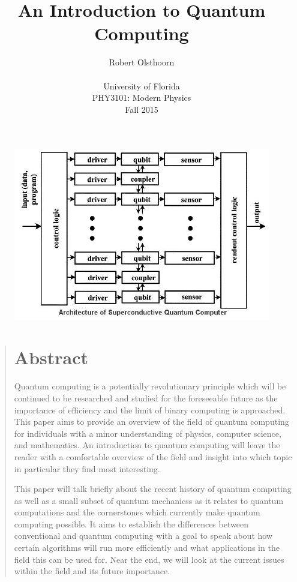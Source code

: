 \documentclass[12pt]{article}
\title{An Introduction to Quantum Computing}
\author
{Robert Olsthoorn\\
\\
\normalsize{University of Florida}\\
\normalsize{PHY3101: Modern Physics}\\
\normalsize{Fall 2015}\\
}
\date{}
\newenvironment{sciabstract}{%
\begin{quote} \bf}
{\end{quote}}
\begin{document}
 





\begin{figure}
\includegraphics[scale=.5]{superconductive}
\centering
\end{figure}

\maketitle 


\newpage

\begin{sciabstract}
\section*{Abstract}
Quantum computing is a potentially revolutionary principle which will be continued to be researched and studied for the foreseeable future as the importance of efficiency and the limit of binary computing is approached. This paper aims to provide an overview of the field of quantum computing for individuals with a minor understanding of physics, computer science, and mathematics. An introduction to quantum computing will leave the reader with a comfortable overview of the field and insight into which topic in particular they find most interesting.\par
This paper will talk briefly about the recent history of quantum computing as well as a small subset of quantum mechanicss as it relates to quantum computations and the cornerstones which currently make quantum computing possible. It aims to establish the differences between conventional and quantum computing with a goal to speak about how certain algorithms will run more efficiently and what applications in the field this can be used for. Near the end, we will look at the current issues within the field and its future importance.

\end{sciabstract}
\end{document}
